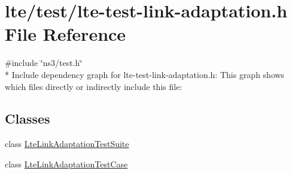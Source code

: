 \hypertarget{lte-test-link-adaptation_8h}{}\section{lte/test/lte-\/test-\/link-\/adaptation.h File Reference}
\label{lte-test-link-adaptation_8h}
{\ttfamily \#include \char`\"{}ns3/test.\+h\char`\"{}}\\*
Include dependency graph for lte-\/test-\/link-\/adaptation.h\+:
This graph shows which files directly or indirectly include this file\+:
\subsection*{Classes}
\begin{DoxyCompactItemize}
\item 
class \hyperlink{classLteLinkAdaptationTestSuite}{Lte\+Link\+Adaptation\+Test\+Suite}
\item 
class \hyperlink{classLteLinkAdaptationTestCase}{Lte\+Link\+Adaptation\+Test\+Case}
\end{DoxyCompactItemize}
